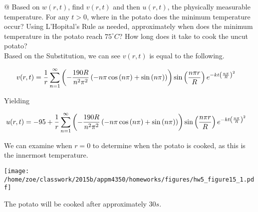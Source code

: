 \documentclass[10pt]{article}
\begin{document}
\begin{easylist}[enumerate]
    @ Based on $w(r, t)$, find $v(r, t)$ and then $u(r, t)$, the physically measurable temperature.  For any $t > 0$,
    where in the potato does the minimum temperature occur? Using L'Hopital's Rule as needed, approximately when does
    the minimum temperature in the potato reach $75^\circ C$? How long does it take to cook the uncut potato?\\

    Based on the Substitution, we can see $v(r, t)$ is equal to the following.

    \begin{align*}
        v(r, t) &= \frac{1}{r} \sum_{n=1}^\infty \left( - \frac{190 R}{n^{2} \pi^{2}} \left(- n \pi \cos{\left (n \pi \right )} + \sin{\left (n \pi \right )}\right) \right) \sin\left( \frac{n\pi r}{R} \right) e^{-kt \left( \frac{n\pi}{R} \right)^2}
    \end{align*}

    Yielding

    \begin{align*}
        u(r, t) &= -95 + \frac{1}{r} \sum_{n=1}^\infty \left( - \frac{190 R}{n^{2} \pi^{2}} \left(- n \pi \cos{\left (n \pi \right )} + \sin{\left (n \pi \right )}\right) \right) \sin\left( \frac{n\pi r}{R} \right) e^{-kt \left( \frac{n\pi}{R} \right)^2}
    \end{align*}

    We can examine when $r = 0$ to determine when the potato is cooked, as this is the innermost temperature.

\simpleweave

\texttt{[image: /home/zoe/classwork/2015b/appm4350/homeworks/figures/hw5\_figure15\_1.pdf]}

\nosimpleweave

    The potato will be cooked after approximately $30s$.
\end{easylist}
\end{document}
